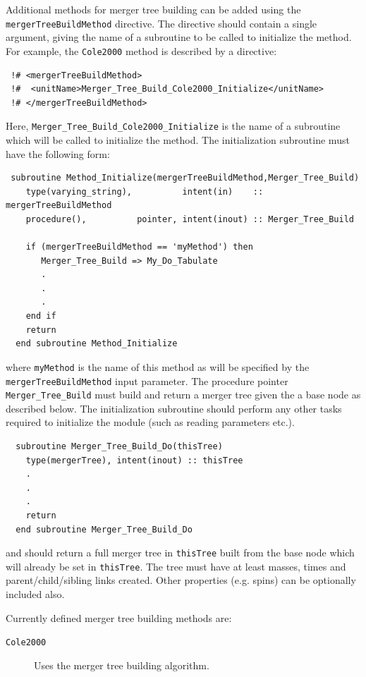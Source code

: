 Additional methods for merger tree building can be added using the {\tt mergerTreeBuildMethod} directive. The directive should contain a single argument, giving the name of a subroutine to be called to initialize the method. For example, the {\tt Cole2000} method is described by a directive:
\begin{verbatim}
 !# <mergerTreeBuildMethod>
 !#  <unitName>Merger_Tree_Build_Cole2000_Initialize</unitName>
 !# </mergerTreeBuildMethod>
\end{verbatim}
Here, {\tt Merger\_Tree\_Build\_Cole2000\_Initialize} is the name of a subroutine which will be called to initialize the method. The initialization subroutine must have the following form:
\begin{verbatim}
 subroutine Method_Initialize(mergerTreeBuildMethod,Merger_Tree_Build)
    type(varying_string),          intent(in)    :: mergerTreeBuildMethod
    procedure(),          pointer, intent(inout) :: Merger_Tree_Build
    
    if (mergerTreeBuildMethod == 'myMethod') then
       Merger_Tree_Build => My_Do_Tabulate
       .
       .
       .
    end if
    return
  end subroutine Method_Initialize
\end{verbatim}
where {\tt myMethod} is the name of this method as will be specified by the {\tt mergerTreeBuildMethod} input parameter. The procedure pointer {\tt Merger\_Tree\_Build} must build and return a merger tree given the a base node as described below. The initialization subroutine should perform any other tasks required to initialize the module (such as reading parameters etc.).

\begin{verbatim}
  subroutine Merger_Tree_Build_Do(thisTree)
    type(mergerTree), intent(inout) :: thisTree
    .
    .
    .
    return
  end subroutine Merger_Tree_Build_Do
\end{verbatim}
and should return a full merger tree in {\tt thisTree} built from the base node which will already be set in {\tt thisTree}. The tree must have at least masses, times and parent/child/sibling links created. Other properties (e.g. spins) can be optionally included also.

Currently defined merger tree building methods are:
\begin{description}
 \item [{\tt Cole2000}] Uses the \cite{cole_hierarchical_2000} merger tree building algorithm.
\end{description}


